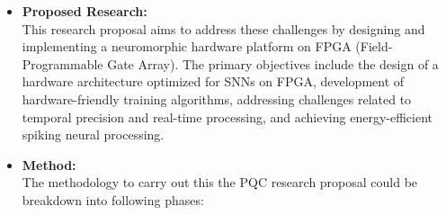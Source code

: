 \begin {itemize}
The objective of this research is to contribute to advancements in neuromorphic hardware, novel training algorithms, and dedicated hardware frameworks to help overcome some of the limitations associated with the implementation of neuromorphic systems.
\item [$\bullet$] { \bf Proposed Research:} \vspace{0.5em} \\
This research proposal aims to address these challenges by designing and implementing a neuromorphic hardware platform on FPGA (Field-Programmable Gate Array). The primary objectives include the design of a hardware architecture optimized for SNNs on FPGA, development of hardware-friendly training algorithms, addressing challenges related to temporal precision and real-time processing, and achieving energy-efficient spiking neural processing.
 \item [$\bullet$] { \bf Method:} \vspace{0.5em} \\
   The methodology to carry out this the PQC research proposal could be breakdown into following phases:
   \begin{itemize}
   

\end{itemize}
\end{itemize}
